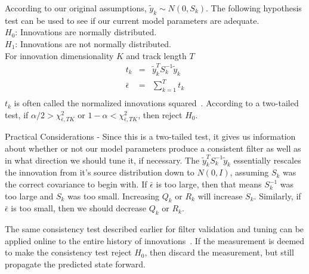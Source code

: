 \medskip
{} According to our original assumptions, $\tilde{y}_k \sim N(0, S_k)$.  The following hypothesis test can be used to see if our current model parameters are adequate.\\
$H_0$: Innovations are normally distributed.\\
$H_1$: Innovations are not normally distributed.\\
For innovation dimensionality $K$ and track length $T$
\begin{eqnarray*}
t_k &=& \tilde{y}_k^T S^{-1}_k \tilde{y}_k\\
\bar{\epsilon} &=& \sum_{k=1}^T t_k\\
\end{eqnarray*}
$t_k$ is often called the normalized innovations squared~\cite{barshalom}.  According to a two-tailed test, if $\alpha/2 > \chi^2_{\bar{\epsilon}, TK}$ or $1-\alpha < \chi^2_{\bar{\epsilon}, TK}$, then reject $H_0$.

\medskip
\noindent Practical Considerations - Since this is a two-tailed test, it gives us information about whether or not our model parameters produce a consistent filter as well as in what direction we should tune it, if necessary.  The $\tilde{y}_k^T S^{-1}_k \tilde{y}_k$ essentially rescales the innovation from it's source distribution down to $N(0,I)$, assuming $S_k$ was the correct covariance to begin with.  If $\bar{\epsilon}$ is too large, then that means $S^{-1}_k$ was too large and $S_k$ was too small.  Increasing $Q_k$ or $R_k$ will increase $S_k$.  Similarly, if $\bar{\epsilon}$ is too small, then we should decrease $Q_k$ or $R_k$.

\medskip
{} The same consistency test described earlier for filter validation and tuning can be applied online to the entire history of innovations~\cite{6178052}.  If the measurement is deemed to make the consistency test reject $H_0$, then discard the measurement, but still propagate the predicted state forward.

